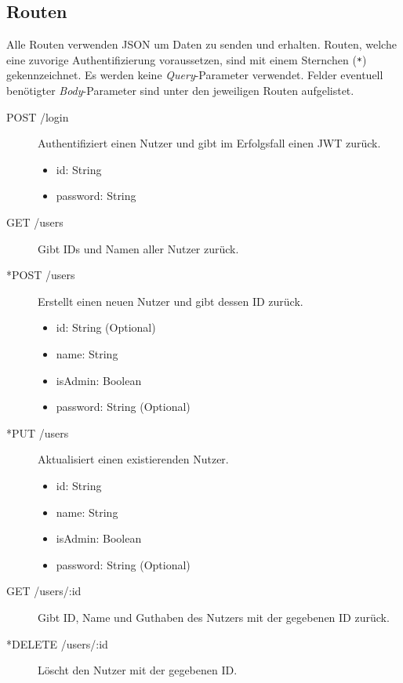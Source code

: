 \subsection*{Routen}
\label{subsec:attachments:routes}

Alle Routen verwenden JSON um Daten zu senden und erhalten.
Routen, welche eine zuvorige Authentifizierung voraussetzen, sind mit einem Sternchen (\verb|*|) gekennzeichnet.
Es werden keine \textit{Query}-Parameter verwendet.
Felder eventuell benötigter \textit{Body}-Parameter sind unter den jeweiligen Routen aufgelistet.

\begin{description}
	\item[POST /login] Authentifiziert einen Nutzer und gibt im Erfolgsfall einen JWT zurück.
	\begin{itemize}
		\item id: String
		\item password: String
	\end{itemize}

	\item[GET /users] Gibt IDs und Namen aller Nutzer zurück.
	
	\item[*POST /users] Erstellt einen neuen Nutzer und gibt dessen ID zurück.
	\begin{itemize}
		\item id: String (Optional)
		\item name: String
		\item isAdmin: Boolean
		\item password: String (Optional)
	\end{itemize}

	\item[*PUT /users] Aktualisiert einen existierenden Nutzer.
	\begin{itemize}
		\item id: String
		\item name: String
		\item isAdmin: Boolean
		\item password: String (Optional)
	\end{itemize}

	\item[GET /users/:id] Gibt ID, Name und Guthaben des Nutzers mit der gegebenen ID zurück.
	
	\item[*DELETE /users/:id] Löscht den Nutzer mit der gegebenen ID.
	

\end{description}
